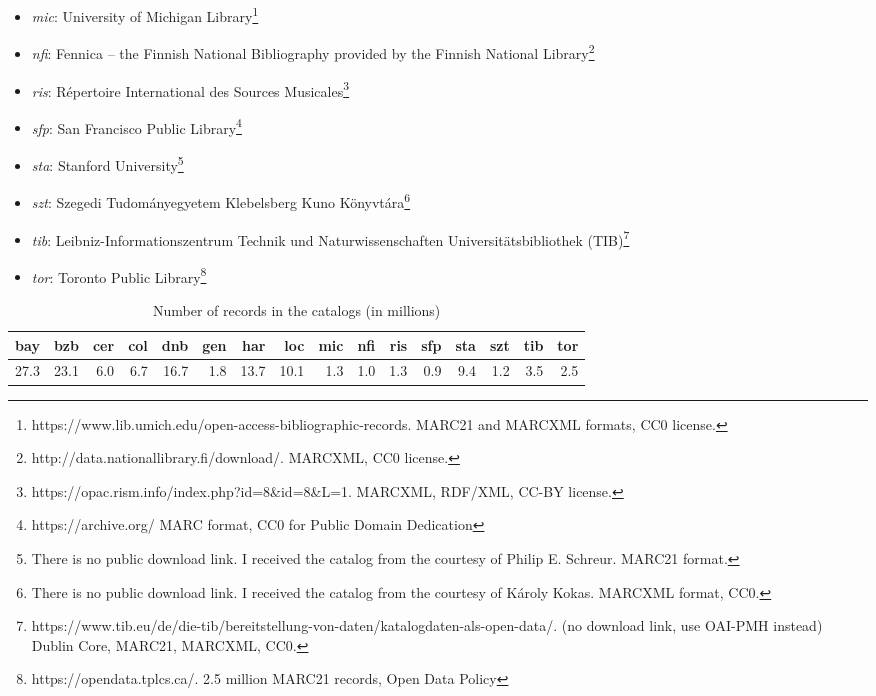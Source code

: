 \begin{itemize}
  \item \emph{mic}: University of Michigan Library\footnote{https://www.lib.umich.edu/open-access-bibliographic-records. MARC21 and MARCXML formats, CC0 license.}
  \item \emph{nfi}: Fennica -- the Finnish National Bibliography provided by the Finnish National Library\footnote{http://data.nationallibrary.fi/download/. MARCXML, CC0 license.}
  \item \emph{ris}: Répertoire International des Sources Musicales\footnote{https://opac.rism.info/index.php?id=8\&id=8\&L=1. MARCXML, RDF/XML, CC-BY license.}
  \item \emph{sfp}: San Francisco Public Library\footnote{
  https://archive.org/
  MARC format, CC0 for Public Domain Dedication}
  \item \emph{sta}: Stanford University\footnote{There is no public download link. I received the catalog from the courtesy of Philip E. Schreur. MARC21 format.}
  \item \emph{szt}: Szegedi Tudományegyetem Klebelsberg Kuno Könyvtára\footnote{There is no public download link. I received the catalog from the courtesy of Károly Kokas. MARCXML format, CC0.}
  \item \emph{tib}: Leibniz-Informationszentrum Technik und Naturwissenschaften Universitätsbibliothek (TIB)\footnote{https://www.tib.eu/de/die-tib/bereitstellung-von-daten/katalogdaten-als-open-data/. (no download link, use OAI-PMH instead) Dublin Core, MARC21, MARCXML, CC0.}
  \item \emph{tor}: Toronto Public Library\footnote{https://opendata.tplcs.ca/. 2.5 million MARC21 records, Open Data Policy}
\end{itemize}

\begin{table}[!ht]
\caption{Number of records in the catalogs (in millions)}
\label{table:number-of-records}
\hspace{-1cm}
\begin{minipage}{\textwidth} %
\begin{center}
\begin{tabular}{rrrrrrrrrrrrrrrr}
  \toprule
  bay & bzb & cer & col & dnb & gen & har & loc & mic & nfi & ris & sfp & sta & szt & tib & tor \\
  \midrule
  27.3 & 23.1 & 6.0 & 6.7 & 16.7 & 1.8 & 13.7 & 10.1 & 1.3 & 1.0 & 1.3 & 0.9 & 9.4 & 1.2 & 3.5 & 2.5 \\
  \bottomrule
\end{tabular}
\end{center}
\end{minipage}
\end{table}

